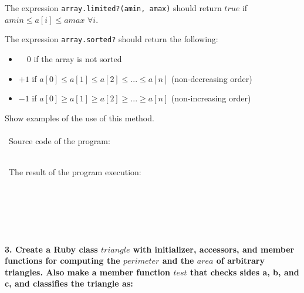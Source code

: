 \documentclass{article}
\begin{document}
	The expression \texttt{array.limited?(amin, amax)} should return \(true\) if  \(amin  \leqslant  a[i]  \leqslant  amax\) \(\forall i\). \newline
	
	The expression \texttt{array.sorted?} should return the following: 
	\begin{itemize}
		\item \ \ \(0\) \quad  if the array is not sorted
		\item \(+1\) \quad if \(a[0] \leqslant a[1] \leqslant a[2] \leqslant ... \leqslant a[n]\) (non-decreasing order)
		\item \(-1\) \quad if \(a[0] \geqslant a[1] \geqslant a[2] \geqslant ... \geqslant a[n]\) (non-increasing order)
	\end{itemize}
	
	Show examples of the use of this method.

\paragraph{}\	
Source code of the program:

\begin{verbatim} 

\end{verbatim}	

\paragraph{}\
	The result of the program execution:
	
\begin{verbatim} 

\end{verbatim}
	
\paragraph{}\
\paragraph{}\

\paragraph{3. Create a Ruby class \(triangle\) with initializer, accessors, and member functions for computing the \(perimeter\) and the \(area\) of arbitrary triangles. Also make a member function \(test\) that checks sides a, b, and c, and classifies the triangle as: }\
\end{document}
